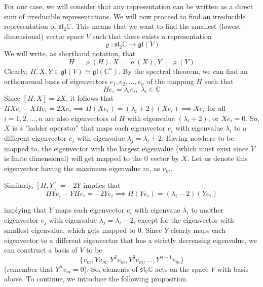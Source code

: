   For our case, we will consider that any representation can be written as a direct sum of irreducible representations. We will now proceed to find an irreducible representation of $\mathfrak{sl}_2 \mathbb{C}$. This means that we want to find the smallest (lowest dimensional) vector space $V$ such that there exists a representation
  \begin{equation}
    \varrho: \mathfrak{sl}_2 \mathbb{C} \rightarrow \mathfrak{gl}(V)
  \end{equation}
  We will write, as shorthand notation, that 
  \begin{equation}
    H = \varrho(H), X = \varrho(X), Y = \varrho(Y)
  \end{equation}
  Clearly, $H, X, Y \in \mathfrak{gl}(V) \simeq \mathfrak{gl}(\mathbb{C}^n)$. By the spectral theorem, we can find an orthonormal basis of eigenvectors $e_1, e_2, ..., e_n$ of the mapping $H$ such that
  \begin{equation}
    H e_i = \lambda_i e_i, \; \lambda_i \in \mathbb{C}
  \end{equation}
  Since $[H,X] = 2X$, it follows that $HX e_i - X H e_i = 2X e_i \implies H (X e_i) = (\lambda_i + 2) (X e_i) \implies Xe_i$ for all $i = 1, 2, ..., n$ are also eigenvectors of $H$ with eigenvalue $(\lambda_i + 2)$, or $X e_i = 0$. So, $X$ is a "ladder operator" that maps each eigenvector $e_i$ with eigenvalue $\lambda_i$ to a different eigenvector $e_j$ with eigenvalue $\lambda_j = \lambda_i + 2$. Having nowhere to be mapped to, the eigenvector with the largest eigenvalue (which must exist since $V$ is finite dimensional) will get mapped to the $0$ vector by $X$. Let us denote this eigenvector having the maximum eigenvalue $m$, as $v_m$. 

  Similarly, $[H,Y] = -2Y$ implies that
  \begin{equation}
    HY e_i - YH e_i = -2Y e_i \implies H(Y e_i) = (\lambda_i - 2)(Y e_i)
  \end{equation}

  implying that $Y$ maps each eigenvector $e_i$ with eigenvaue $\lambda_i$ to another eigenvector $e_j$ with eigenvalue $\lambda_j = \lambda_i - 2$, except for the eigenvector with smallest eigenvalue, which gets mapped to $0$. Since $Y$ clearly maps each eigenvector to a different eigenvector that has a strictly decreasing eigenvalue, we can construct a basis of $V$ to be
  \begin{equation}
    \{v_m, Y v_m, Y^2 v_m, Y^3 v_m, ..., Y^{n-1} v_m\}
  \end{equation}
  (remember that $Y^n v_m = 0$). So, elements of $\mathfrak{sl}_2 \mathbb{C}$ acts on the space $V$ with basis above. To continue, we introduce the following proposition. 

